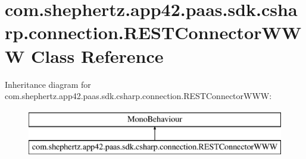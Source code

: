 \hypertarget{classcom_1_1shephertz_1_1app42_1_1paas_1_1sdk_1_1csharp_1_1connection_1_1_r_e_s_t_connector_w_w_w}{\section{com.\+shephertz.\+app42.\+paas.\+sdk.\+csharp.\+connection.\+R\+E\+S\+T\+Connector\+W\+W\+W Class Reference}
\label{classcom_1_1shephertz_1_1app42_1_1paas_1_1sdk_1_1csharp_1_1connection_1_1_r_e_s_t_connector_w_w_w}
}
Inheritance diagram for com.\+shephertz.\+app42.\+paas.\+sdk.\+csharp.\+connection.\+R\+E\+S\+T\+Connector\+W\+W\+W\+:\begin{figure}[H]
\begin{center}
\leavevmode
\includegraphics[height=2.000000cm]{classcom_1_1shephertz_1_1app42_1_1paas_1_1sdk_1_1csharp_1_1connection_1_1_r_e_s_t_connector_w_w_w}
\end{center}
\end{figure}
